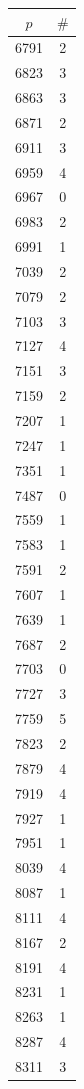 \documentclass{article}
\theoremstyle{definition}
\begin{document}
\begin{table}[htbp]
\begin{minipage}{0.135\textwidth}
    \begin{tabular}{c|c}
        $p$ & $\#$ \\ \hline
        6791 & 2 \\
        6823 & 3 \\
        6863 & 3 \\
        6871 & 2 \\
        6911 & 3 \\
        6959 & 4 \\
        6967 & 0 \\
        6983 & 2 \\
        6991 & 1 \\
        7039 & 2 \\
        7079 & 2 \\
        7103 & 3 \\
        7127 & 4 \\
        7151 & 3 \\
        7159 & 2 \\
        7207 & 1 \\
        7247 & 1 \\
        7351 & 1 \\
        7487 & 0 \\
        7559 & 1 \\
        7583 & 1 \\
        7591 & 2 \\
        7607 & 1 \\
        7639 & 1 \\
        7687 & 2 \\
        7703 & 0 \\
        7727 & 3 \\
        7759 & 5 \\
        7823 & 2 \\
        7879 & 4 \\
        7919 & 4 \\
        7927 & 1 \\
        7951 & 1 \\
        8039 & 4 \\
        8087 & 1 \\
        8111 & 4 \\
        8167 & 2 \\
        8191 & 4 \\
        8231 & 1 \\
        8263 & 1 \\
        8287 & 4 \\
        8311 & 3 \\

\end{tabular}
\end{minipage}
\end{table}
\end{document}

